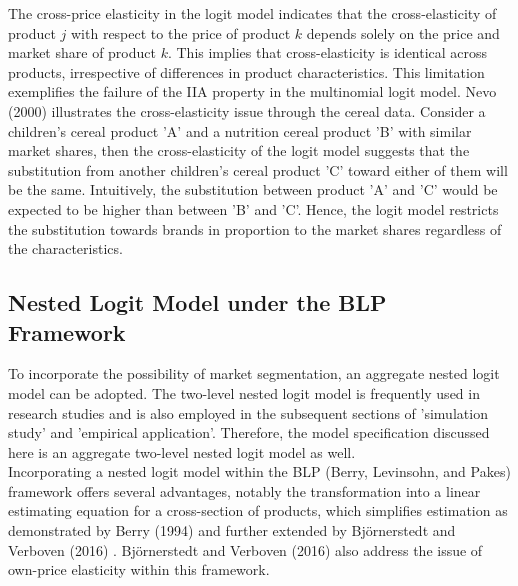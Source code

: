 \documentclass[a4paper,11pt]{article}
\begin{document}
    The cross-price elasticity in the logit model indicates that the cross-elasticity of product $j$ with respect to the price of product $k$ depends solely on the price and market share of product $k$. This implies that cross-elasticity is identical across products, irrespective of differences in product characteristics. This limitation exemplifies the failure of the IIA property in the multinomial logit model. Nevo (2000) illustrates the cross-elasticity issue through the cereal data. Consider a children's cereal product 'A' and a nutrition cereal product 'B' with similar market shares, then the cross-elasticity of the logit model suggests that the substitution from another children's cereal product 'C' toward either of them will be the same. Intuitively, the substitution between product 'A' and 'C' would be expected to be higher than between 'B' and 'C'. Hence, the logit model restricts the substitution towards brands in proportion to the market shares regardless of the characteristics.\\

    

\subsection{Nested Logit Model under the BLP Framework}
\label{subsec: NLM}

    To incorporate the possibility of market segmentation, an aggregate nested logit model can be adopted. The two-level nested logit model is frequently used in research studies and is also employed in the subsequent sections of 'simulation study' and 'empirical application'. Therefore, the model specification discussed here is an aggregate two-level nested logit model as well. \\

    Incorporating a nested logit model within the BLP (Berry, Levinsohn, and Pakes) framework offers several advantages, notably the transformation into a linear estimating equation for a cross-section of products, which simplifies estimation as demonstrated by Berry (1994) \cite{berry1994estimating} and further extended by Björnerstedt and Verboven (2016) \cite{Björnerstedt&Verboven2016}. Björnerstedt and Verboven (2016) also address the issue of own-price elasticity within this framework.\\
\end{document}
